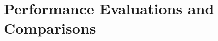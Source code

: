 
\renewcommand{\curChapter}{main/chapter4}

\chapter{Performance Evaluations and Comparisons}
\label{chap:eval}
